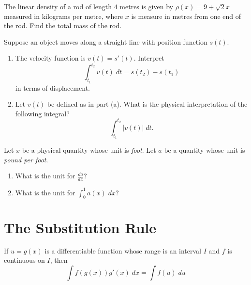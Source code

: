 \documentclass[../main.tex]{subfiles}
\begin{document}
\begin{example}
  The linear density of a rod of length \(4\) metres is given by \(\rho(x) = 9 + \sqrt{2} x\) measured in kilograms per metre, where \(x\) is measure in metres from one end of the rod. Find the total mass of the rod. 
\end{example}
\clearpage

\begin{example}
  Suppose an object moves along a straight line with position function \(s(t)\). 
 
  \begin{enumerate}[label=(\alph*)]
  \item The velocity function is \(v(t) = s'(t)\). Interpret
    \[
      \int_{t_{1}}^{t_{2}} v(t) \;dt = s(t_{2}) - s(t_{1})
    \]
    in terms of displacement.
    \vspace{1in}

  \item Let \(v(t)\) be defined as in part (a). What is the physical interpretation of the following integral?
    \[
      \int_{t_{1}}^{t_{2}} |v(t)| \; dt.
    \]
    \vspace{2in}
  \end{enumerate}
\end{example}

\begin{example}
  Let \(x\) be a physical quantity whose unit is \emph{foot}. Let \(a\) be a quantity whose unit is \emph{pound per foot}.
  \begin{enumerate}
  \item What is the unit for \(\frac{da}{dx}\)?
    \vspace{1in}
  \item What is the unit for \(\int_{0}^{1} a(x) \;dx\)?
    \vspace{1in}
  \end{enumerate}
\end{example}

\clearpage

\section{The Substitution Rule}

\begin{mdframed}[style=withref]
  If \(u = g(x)\) is a differentiable function whose range is an interval \(I\) and \(f\) is continuous on \(I\), then
  \[
    {\int f(g(x)) g'(x) \;dx = \int f(u) \;du}
  \]
\end{mdframed}
\vspace{2in}
\end{document}
